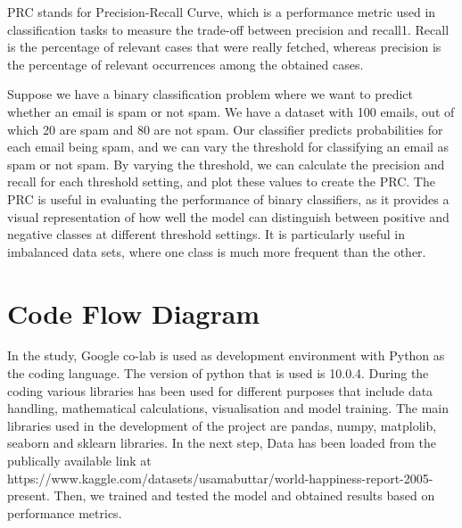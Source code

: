 \documentclass[12pt, a4paper, twoside]{report}
\theoremstyle{plain} %
\theoremstyle{definition} %
\theoremstyle{remark} %
\numberwithin{equation}{chapter}
\begin{document}
\begin{enumerate}
\begin{itemize}
PRC stands for Precision-Recall Curve, which is a performance metric used in classification tasks to measure the trade-off between precision and recall1. Recall is the percentage of relevant cases that were really fetched, whereas precision is the percentage of relevant occurrences among the obtained cases.


Suppose we have a binary classification problem where we want to predict whether an email is spam or not spam.
We have a dataset with 100 emails, out of which 20 are spam and 80 are not spam.
Our classifier predicts probabilities for each email being spam, and we can vary the threshold for classifying an email as spam or not spam.
By varying the threshold, we can calculate the precision and recall for each threshold setting, and plot these values to create the PRC.
The PRC is useful in evaluating the performance of binary classifiers, as it provides a visual representation of how well the model can distinguish between positive and negative classes at different threshold settings. It is particularly useful in imbalanced data sets, where one class is much more frequent than the other.

\end{itemize}
\newpage
\section{Code Flow Diagram}
In the study, Google co-lab is used as development environment with Python as the coding language. The version of python that is used is 10.0.4. During the coding various libraries has been used for different purposes that include data handling, mathematical calculations, visualisation and model training. The main libraries used in the development of the project are pandas, numpy, matplolib, seaborn and sklearn libraries. In the next step, Data has been loaded from the publically available link at https://www.kaggle.com/datasets/usamabuttar/world-happiness-report-2005-present. Then, we trained and tested the model and obtained results based on performance metrics. 


\end{enumerate}
\end{document}
